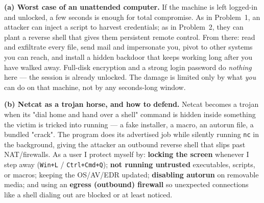 \documentclass[a4paper, 10pt]{article}
\begin{document}
\begin{solution}
	\noindent \textbf{(a) Worst case of an unattended computer.} If the machine is left logged-in
	and unlocked, a few seconds is enough for total compromise. As in Problem~1, an attacker can
	inject a script to harvest credentials; as in Problem~2, they can plant a reverse shell that
	gives them persistent remote control. From there: read and exfiltrate every file, send mail and
	impersonate you, pivot to other systems you can reach, and install a hidden backdoor that keeps
	working long after you have walked away. Full-disk encryption and a strong login password do
	\emph{nothing} here --- the session is already unlocked. The damage is limited only by what
	\emph{you} can do on that machine, not by any seconds-long window.

	\myspace

	\noindent \textbf{(b) Netcat as a trojan horse, and how to defend.} Netcat becomes a trojan when
	its "dial home and hand over a shell" command is hidden inside something the victim is tricked
	into running --- a fake installer, a macro, an autorun file, a bundled "crack". The program does
	its advertised job while silently running \texttt{nc} in the background, giving the attacker an
	outbound reverse shell that slips past NAT/firewalls. As a user I protect myself by:
	\textbf{locking the screen} whenever I step away (\texttt{Win+L} / \texttt{Ctrl+Cmd+Q});
	\textbf{not running untrusted} executables, scripts, or macros; keeping the OS/AV/EDR updated;
	\textbf{disabling autorun} on removable media; and using an \textbf{egress (outbound) firewall}
	so unexpected connections like a shell dialing out are blocked or at least noticed.
\end{solution}
\end{document}

